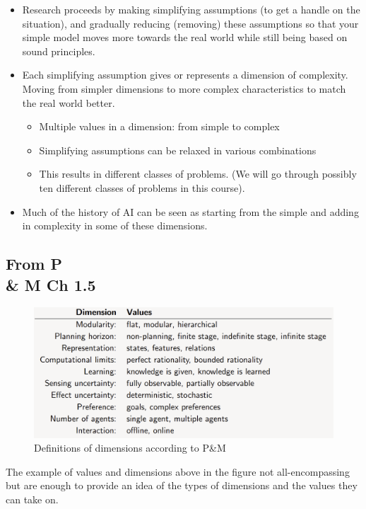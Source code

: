 \documentclass[12pt]{article}
\begin{document}
\begin{itemize}
    \item Research proceeds by making simplifying assumptions (to get a handle on the situation), and gradually reducing (removing) these assumptions so that your simple model moves more towards the real world while still being based on sound principles.
    \item Each simplifying assumption gives or represents a dimension of complexity. Moving from simpler dimensions to more complex characteristics to match the real world better.
    \begin{itemize}
        \item Multiple values in a dimension: from simple to complex
        \item Simplifying assumptions can be relaxed in various combinations
        \item This results in different classes of problems. (We will go through possibly ten different classes of problems in this course).
    \end{itemize}
    \item Much of the history of AI can be seen as starting from the simple and adding in complexity in some of these dimensions.
\end{itemize}

\subsection*{From P \\& M Ch 1.5}

\begin{figure}[h!]
        \centering
        \includegraphics[scale=0.4]{definition-dimensions.png}
        \caption{Definitions of dimensions according to P\&M}
        \label{fig:my_label}
\end{figure}

\noindent The example of values and dimensions above in the figure not all-encompassing but are enough to provide an idea of the types of dimensions and the values they can take on.
\end{document}
